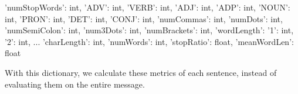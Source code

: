 \begin{python}
{
	'numStopWords': int,
	'ADV': int,
	'VERB': int,
	'ADJ': int,
	'ADP': int,
	'NOUN': int,
	'PRON': int,
	'DET': int,
	'CONJ': int,
	'numCommas': int,
	'numDots': int,
	'numSemiColon': int,
	'num3Dots': int,
	'numBrackets': int,
	'wordLength':
	{
		'1': int,
		'2': int,
		...
	}
	'charLength': int,
	'numWords': int,
	'stopRatio': float,
	'meanWordLen': float
}
\end{python}

With this dictionary, we calculate these metrics of each sentence, instead of evaluating them on the entire message.